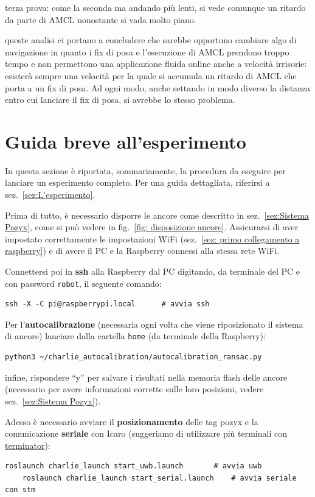 terza prova: come la seconda ma andando più lenti, si vede comunque un ritardo da parte di AMCL nonostante si vada molto piano.

queste analisi ci portano a concludere che sarebbe opportuno cambiare algo di navigazione in quanto i fix di posa e l'esecuzione di AMCL prendono troppo tempo e non permettono una applicazione fluida online anche a velocità irrisorie: esisterà sempre una velocità per la quale si accumula un ritardo di AMCL che porta a un fix di posa. Ad ogni modo, anche settando in modo diverso la distanza entro cui lanciare il fix di posa, si avrebbe lo stesso problema.

\newpage
\section{Guida breve all'esperimento}
\label{sez: Guida breve all'esperimento}
In questa sezione è riportata, sommariamente, la procedura da eseguire per lanciare un esperimento completo. Per una guida dettagliata, riferirsi a 
sez.~\ref{sez:L'esperimento}. 

Prima di tutto, è necessario disporre le ancore come descritto in sez.~\ref{sez:Sistema Pozyx}, come si può vedere in fig.~\ref{fig: disposizione ancore}. 
Assicurarsi di aver impostato correttamente le impostazioni WiFi (sez.~\ref{sez: primo collegamento a raspberry}) e di avere il PC e la Raspberry connessi 
alla stessa rete WiFi.


Connettersi poi in \textbf{ssh} alla Raspberry dal PC digitando, da terminale del PC e con password \texttt{robot}, il seguente comando:
\begin{lstlisting}[style=bashPC]
	ssh -X -C pi@raspberrypi.local		# avvia ssh
\end{lstlisting}

Per l'\textbf{autocalibrazione} (necessaria ogni volta che viene riposizionato il sistema di ancore) lanciare 
dalla cartella \texttt{home} (da terminale della Raspberry):
\begin{lstlisting}[style=bash]
	python3 ~/charlie_autocalibration/autocalibration_ransac.py
\end{lstlisting}
infine, rispondere ``y'' per salvare i risultati nella memoria flash delle ancore (necessario per avere informazioni corrette sulle loro posizioni, vedere 
sez.~\ref{sez:Sistema Pozyx}).

Adesso è necessario avviare il \textbf{posizionamento} delle tag pozyx e la comunicazione \textbf{seriale} con Icaro (suggeriamo di utilizzare più terminali 
con \href{https://terminator-gtk3.readthedocs.io/en/latest/}{terminator}):
\begin{lstlisting}[style=bash]
	roslaunch charlie_launch start_uwb.launch		# avvia uwb
	roslaunch charlie_launch start_serial.launch	# avvia seriale con stm
\end{lstlisting}

